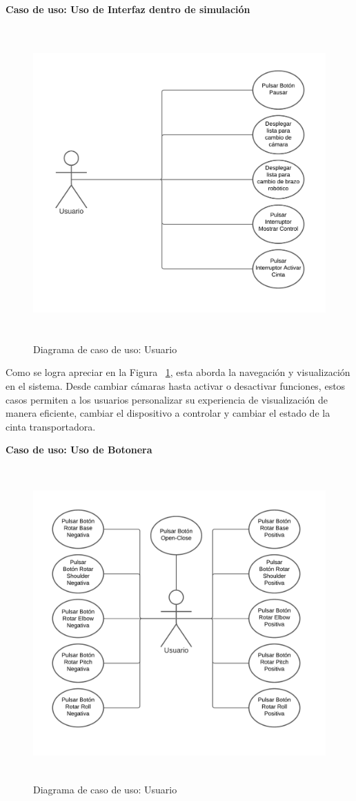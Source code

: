 \textbf{Caso de uso: Uso de Interfaz dentro de simulación}
\begin{figure}[ht]
\centering
\includegraphics[width=13cm, height=12cm]{figures/cuuisimulacion.png}
\caption{Diagrama de caso de uso: Usuario}
\label{fig:cuuisimulacion}
\end{figure}

Como se logra apreciar en la Figura ~\ref{fig:cuuisimulacion}, esta aborda la navegación y visualización en el sistema. Desde cambiar cámaras hasta activar o desactivar funciones, estos casos permiten a los usuarios personalizar su experiencia de visualización de manera eficiente, cambiar el dispositivo a controlar y cambiar el estado de la cinta transportadora.

\clearpage
\textbf{Caso de uso: Uso de Botonera}
\begin{figure}[ht]
\centering
\includegraphics[width=13cm, height=12cm]{figures/cubotonera.png}
\caption{Diagrama de caso de uso: Usuario}
\label{fig:cubotonera}
\end{figure}

